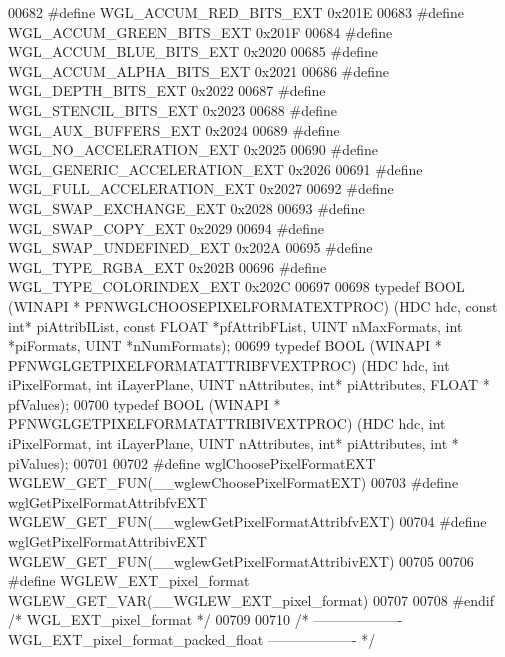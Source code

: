 \begin{DoxyCode}
00682 \textcolor{preprocessor}{#define WGL\_ACCUM\_RED\_BITS\_EXT 0x201E}
00683 \textcolor{preprocessor}{#define WGL\_ACCUM\_GREEN\_BITS\_EXT 0x201F}
00684 \textcolor{preprocessor}{#define WGL\_ACCUM\_BLUE\_BITS\_EXT 0x2020}
00685 \textcolor{preprocessor}{#define WGL\_ACCUM\_ALPHA\_BITS\_EXT 0x2021}
00686 \textcolor{preprocessor}{#define WGL\_DEPTH\_BITS\_EXT 0x2022}
00687 \textcolor{preprocessor}{#define WGL\_STENCIL\_BITS\_EXT 0x2023}
00688 \textcolor{preprocessor}{#define WGL\_AUX\_BUFFERS\_EXT 0x2024}
00689 \textcolor{preprocessor}{#define WGL\_NO\_ACCELERATION\_EXT 0x2025}
00690 \textcolor{preprocessor}{#define WGL\_GENERIC\_ACCELERATION\_EXT 0x2026}
00691 \textcolor{preprocessor}{#define WGL\_FULL\_ACCELERATION\_EXT 0x2027}
00692 \textcolor{preprocessor}{#define WGL\_SWAP\_EXCHANGE\_EXT 0x2028}
00693 \textcolor{preprocessor}{#define WGL\_SWAP\_COPY\_EXT 0x2029}
00694 \textcolor{preprocessor}{#define WGL\_SWAP\_UNDEFINED\_EXT 0x202A}
00695 \textcolor{preprocessor}{#define WGL\_TYPE\_RGBA\_EXT 0x202B}
00696 \textcolor{preprocessor}{#define WGL\_TYPE\_COLORINDEX\_EXT 0x202C}
00697 
00698 \textcolor{keyword}{typedef} BOOL (WINAPI * PFNWGLCHOOSEPIXELFORMATEXTPROC) (HDC hdc, \textcolor{keyword}{const} \textcolor{keywordtype}{int}* 
      piAttribIList, \textcolor{keyword}{const} FLOAT *pfAttribFList, UINT nMaxFormats, \textcolor{keywordtype}{int} *piFormats, 
      UINT *nNumFormats);
00699 \textcolor{keyword}{typedef} BOOL (WINAPI * PFNWGLGETPIXELFORMATATTRIBFVEXTPROC) (HDC hdc, \textcolor{keywordtype}{int} 
      iPixelFormat, \textcolor{keywordtype}{int} iLayerPlane, UINT nAttributes, \textcolor{keywordtype}{int}* piAttributes, FLOAT *
      pfValues);
00700 \textcolor{keyword}{typedef} BOOL (WINAPI * PFNWGLGETPIXELFORMATATTRIBIVEXTPROC) (HDC hdc, \textcolor{keywordtype}{int} 
      iPixelFormat, \textcolor{keywordtype}{int} iLayerPlane, UINT nAttributes, \textcolor{keywordtype}{int}* piAttributes, \textcolor{keywordtype}{int} *
      piValues);
00701 
00702 \textcolor{preprocessor}{#define wglChoosePixelFormatEXT WGLEW\_GET\_FUN(\_\_wglewChoosePixelFormatEXT)}
00703 \textcolor{preprocessor}{#define wglGetPixelFormatAttribfvEXT WGLEW\_GET\_FUN(\_\_wglewGetPixelFormatAttribfvEXT)}
00704 \textcolor{preprocessor}{#define wglGetPixelFormatAttribivEXT WGLEW\_GET\_FUN(\_\_wglewGetPixelFormatAttribivEXT)}
00705 
00706 \textcolor{preprocessor}{#define WGLEW\_EXT\_pixel\_format WGLEW\_GET\_VAR(\_\_WGLEW\_EXT\_pixel\_format)}
00707 
00708 \textcolor{preprocessor}{#endif }\textcolor{comment}{/* WGL\_EXT\_pixel\_format */}\textcolor{preprocessor}{}
00709 
00710 \textcolor{comment}{/* ------------------- WGL\_EXT\_pixel\_format\_packed\_float ------------------- */}

\end{DoxyCode}
